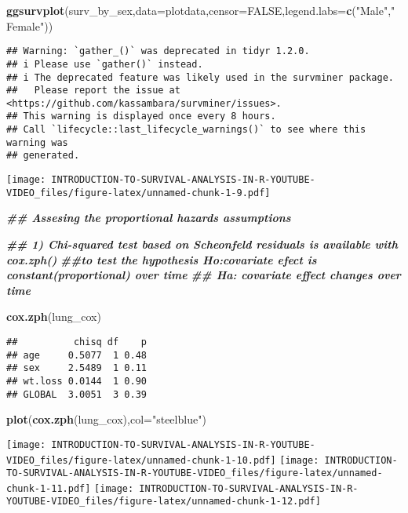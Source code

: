 \documentclass[
]{article}
\newenvironment{Shaded}{\begin{snugshade}}{\end{snugshade}}
\newcommand{\AttributeTok}[1]{\textcolor[rgb]{0.13,0.29,0.53}{#1}}
\newcommand{\ConstantTok}[1]{\textcolor[rgb]{0.56,0.35,0.01}{#1}}
\newcommand{\DocumentationTok}[1]{\textcolor[rgb]{0.56,0.35,0.01}{\textbf{\textit{#1}}}}
\newcommand{\FunctionTok}[1]{\textcolor[rgb]{0.13,0.29,0.53}{\textbf{#1}}}
\newcommand{\NormalTok}[1]{#1}
\newcommand{\StringTok}[1]{\textcolor[rgb]{0.31,0.60,0.02}{#1}}
\begin{document}
\begin{Shaded}
\begin{Highlighting}[]
\FunctionTok{ggsurvplot}\NormalTok{(surv\_by\_sex,}\AttributeTok{data=}\NormalTok{plotdata,}\AttributeTok{censor=}\ConstantTok{FALSE}\NormalTok{,}\AttributeTok{legend.labs=}\FunctionTok{c}\NormalTok{(}\StringTok{"Male"}\NormalTok{,}\StringTok{"Female"}\NormalTok{))}
\end{Highlighting}
\end{Shaded}

\begin{verbatim}
## Warning: `gather_()` was deprecated in tidyr 1.2.0.
## i Please use `gather()` instead.
## i The deprecated feature was likely used in the survminer package.
##   Please report the issue at <https://github.com/kassambara/survminer/issues>.
## This warning is displayed once every 8 hours.
## Call `lifecycle::last_lifecycle_warnings()` to see where this warning was
## generated.
\end{verbatim}

\texttt{[image: INTRODUCTION-TO-SURVIVAL-ANALYSIS-IN-R-YOUTUBE-VIDEO\_files/figure-latex/unnamed-chunk-1-9.pdf]}

\begin{Shaded}
\begin{Highlighting}[]
\DocumentationTok{\#\# Assesing the proportional hazards assumptions}

\DocumentationTok{\#\# 1) Chi{-}squared test based on Scheonfeld residuals is available with cox.zph()}
\DocumentationTok{\#\#to test the hypothesis  Ho:covariate efect is constant(proportional) over time}
\DocumentationTok{\#\# Ha: covariate effect changes over time}

\FunctionTok{cox.zph}\NormalTok{(lung\_cox)}
\end{Highlighting}
\end{Shaded}

\begin{verbatim}
##          chisq df    p
## age     0.5077  1 0.48
## sex     2.5489  1 0.11
## wt.loss 0.0144  1 0.90
## GLOBAL  3.0051  3 0.39
\end{verbatim}

\begin{Shaded}
\begin{Highlighting}[]
\FunctionTok{plot}\NormalTok{(}\FunctionTok{cox.zph}\NormalTok{(lung\_cox),}\AttributeTok{col=}\StringTok{"steelblue"}\NormalTok{)}
\end{Highlighting}
\end{Shaded}

\texttt{[image: INTRODUCTION-TO-SURVIVAL-ANALYSIS-IN-R-YOUTUBE-VIDEO\_files/figure-latex/unnamed-chunk-1-10.pdf]}
\texttt{[image: INTRODUCTION-TO-SURVIVAL-ANALYSIS-IN-R-YOUTUBE-VIDEO\_files/figure-latex/unnamed-chunk-1-11.pdf]}
\texttt{[image: INTRODUCTION-TO-SURVIVAL-ANALYSIS-IN-R-YOUTUBE-VIDEO\_files/figure-latex/unnamed-chunk-1-12.pdf]}
\end{document}
